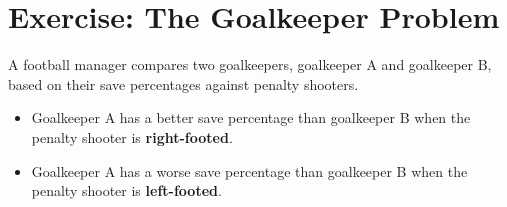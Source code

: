 \documentclass[11pt]{article}
\newif\ifshowanswers
\begin{document}
\ifshowanswers
\paragraph{Solution.}

We enumerate all the red sides that could be showing up:

\begin{itemize}
  \item The RR card has two red sides, so it can appear as either side: RR1 or RR2.
  \item The RB card has one red side: RB-red.
\end{itemize}

So the possible ways a red side can face up are: RR1, RR2, RB-red.
In two of them (RR1 and RR2), the hidden side is also red.
In one of them (RB-red), the hidden side is black.
So, the probability that the other side is red given a red side is up is:

\begin{align*}
  P(\text{other side is red} \mid \text{red side is up}) &= \frac{\text{Number of favorable outcomes}}{\text{Total outcomes}} \\
                                                         &= \frac{2}{3}
\end{align*}

\noindent
\textbf{Answer:} $\boxed{2/3}$

\noindent
\textbf{Intuitive Guess:} Many people guess $1/2$, reasoning that since there are two cards, and both are possible to be picked since both have a red side, the chances are even.
However, although both cards have a red side, the RR is more likely to be picked when a red side is seen because it has two red sides.
Specifically, it has a $\frac{2}{3}$ chance to be picked, while the RB card has only a $\frac{1}{3}$ chance to be picked.
\fi


\section{Exercise: The Goalkeeper Problem}

A football manager compares two goalkeepers, goalkeeper A and goalkeeper B, based on their save percentages against penalty shooters.

\begin{itemize}
  \item Goalkeeper A has a better save percentage than goalkeeper B when the penalty shooter is \textbf{right-footed}.
  \item Goalkeeper A has a worse save percentage than goalkeeper B when the penalty shooter is \textbf{left-footed}.
\end{itemize}
\end{document}
